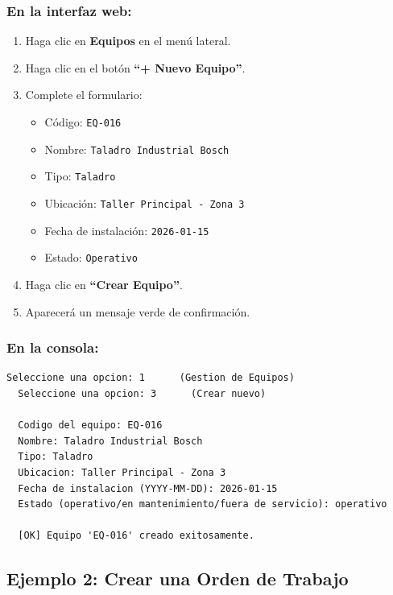 \documentclass[12pt, a4paper]{article}
\begin{document}
\subsubsection{En la interfaz web:}
\begin{enumerate}[leftmargin=2em]
    \item Haga clic en \textbf{Equipos} en el men\'u lateral.
    \item Haga clic en el bot\'on \textbf{``+ Nuevo Equipo''}.
    \item Complete el formulario:
    \begin{itemize}
        \item C\'odigo: \texttt{EQ-016}
        \item Nombre: \texttt{Taladro Industrial Bosch}
        \item Tipo: \texttt{Taladro}
        \item Ubicaci\'on: \texttt{Taller Principal - Zona 3}
        \item Fecha de instalaci\'on: \texttt{2026-01-15}
        \item Estado: \texttt{Operativo}
    \end{itemize}
    \item Haga clic en \textbf{``Crear Equipo''}.
    \item Aparecer\'a un mensaje verde de confirmaci\'on.
\end{enumerate}

\subsubsection{En la consola:}
\begin{lstlisting}[style=console]
  Seleccione una opcion: 1      (Gestion de Equipos)
  Seleccione una opcion: 3      (Crear nuevo)

  Codigo del equipo: EQ-016
  Nombre: Taladro Industrial Bosch
  Tipo: Taladro
  Ubicacion: Taller Principal - Zona 3
  Fecha de instalacion (YYYY-MM-DD): 2026-01-15
  Estado (operativo/en mantenimiento/fuera de servicio): operativo

  [OK] Equipo 'EQ-016' creado exitosamente.
\end{lstlisting}

\subsection{Ejemplo 2: Crear una Orden de Trabajo}
\end{document}

